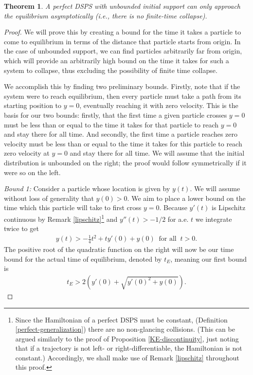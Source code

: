 \documentclass[11pt]{article}
\newtheorem{theorem}{Theorem}[section]
\numberwithin{equation}{section}
\begin{document}
        \begin{theorem}
            A perfect DSPS with unbounded initial support can only approach the equilibrium asymptotically (i.e., there is no finite-time collapse). 
        \end{theorem}
    
        \begin{proof}
            We will prove this by creating a bound for the time it takes a particle to come to equilibrium in terms of the distance that particle starts from origin. In the case of unbounded support, we can find particles arbitrarily far from origin, which will provide an arbitrarily high bound on the time it takes for such a system to collapse, thus excluding the possibility of finite time collapse.
            
            We accomplish this by finding two preliminary bounds. Firstly, note that if the system were to reach equilibrium, then every particle must take a path from its starting position to $y=0$, eventually reaching it with zero velocity. This is the basis for our two bounds: firstly, that the first time a given particle crosses $y=0$ must be less than or equal to the time it takes for that particle to reach $y=0$ and stay there for all time. And secondly, the first time a particle reaches zero velocity must be less than or equal to the time it takes for this particle to reach zero velocity at $y=0$ and stay there for all time. We will assume that the initial distribution is unbounded on the right; the proof would follow symmetrically if it were so on the left.
            
            \textit{Bound 1:} Consider a particle whose location is given by $y(t)$. We will assume without loss of generality that $y(0) > 0$. We aim to place a lower bound on the time which this particle will take to first cross $y=0$. 
            Because $y'(t)$ is Lipschitz continuous by Remark \ref{lipschitz}\footnote{Since the Hamiltonian of a perfect DSPS must be constant, (Definition \ref{perfect-generalization}) there are no non-glancing collisions. (This can be argued similarly to the proof of Proposition \ref{KE-discontinuity}, just noting that if a trajectory is not left- or right-differentiable, the Hamiltonian is not constant.) Accordingly, we shall make use of Remark \ref{lipschitz} throughout this proof.} and $y''(t)>-1/2$ for a.e. $t$ we integrate twice to get
            \begin{align*}
                y(t) > -\frac{1}{4}t^2 + ty'(0) + y(0)\ \mbox{ for all }\ t>0.
            \end{align*}
            The positive root of the quadratic function on the right will now be our time bound for the actual time of equilibrium, denoted by $t_E$, meaning our first bound is
            \begin{align*}
                t_E > 2\left(y'(0) + \sqrt{y'(0)^2+y(0)}\right).
            \end{align*}
            

\end{proof}
\end{document}
